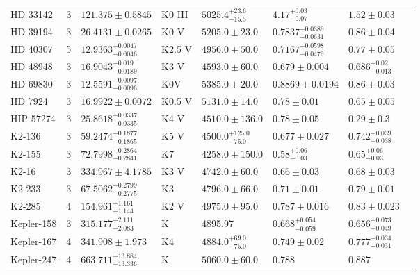 \begin{tabular}{lrllllll}
HD 33142 & 3 & $121.375 \pm 0.5845$ & K0 III & $5025.4^{+23.6}_{-15.5}$ & $4.17^{+0.03}_{-0.07}$ & $1.52 \pm 0.03$ & \cite{TRIFONOV_ET_AL_2022} \\
HD 39194 & 3 & $26.4131 \pm 0.0265$ & K0 V & $5205.0 \pm 23.0$ & $0.7837^{+0.0389}_{-0.0631}$ & $0.86 \pm 0.04$ & \cite{UNGER_ET_AL__2021} \\
HD 40307 & 5 & $12.9363^{+0.0047}_{-0.0046}$ & K2.5 V & $4956.0 \pm 50.0$ & $0.7167^{+0.0598}_{-0.0479}$ & $0.77 \pm 0.05$ & \cite{TUOMI_ET_AL__2013} \\
HD 48948 & 3 & $16.9043^{+0.019}_{-0.0189}$ & K3 V & $4593.0 \pm 60.0$ & $0.679 \pm 0.004$ & $0.686^{+0.02}_{-0.013}$ & \cite{DALAL_ET_AL__2024} \\
HD 69830 & 3 & $12.5591^{+0.0097}_{-0.0096}$ & K0V & $5385.0 \pm 20.0$ & $0.8869 \pm 0.0194$ & $0.86 \pm 0.03$ & \cite{LOVIS_ET_AL__2006} \\
HD 7924 & 3 & $16.9922 \pm 0.0072$ & K0.5 V & $5131.0 \pm 14.0$ & $0.78 \pm 0.01$ & $0.65 \pm 0.05$ & \cite{STASSUN_ET_AL__2017} \\
HIP 57274 & 3 & $25.8618^{+0.0337}_{-0.0335}$ & K4 V & $4510.0 \pm 136.0$ & $0.78 \pm 0.05$ & $0.29 \pm 0.3$ & \cite{STASSUN_ET_AL__2017} \\
K2-136 & 3 & $59.2474^{+0.1877}_{-0.1865}$ & K5 V & $4500.0^{+125.0}_{-75.0}$ & $0.677 \pm 0.027$ & $0.742^{+0.039}_{-0.038}$ & \cite{MAYO_ET_AL_2023} \\
K2-155 & 3 & $72.7998^{+0.2864}_{-0.2841}$ & K7 & $4258.0 \pm 150.0$ & $0.58^{+0.06}_{-0.03}$ & $0.65^{+0.06}_{-0.03}$ & \cite{D_IACUTE_EZ_ALONSO_ET_AL__2018} \\
K2-16 & 3 & $334.967 \pm 4.1785$ & K3 V & $4742.0 \pm 60.0$ & $0.66 \pm 0.03$ & $0.68 \pm 0.03$ & \cite{SINUKOFF_ET_AL__2016} \\
K2-233 & 3 & $67.5062^{+0.2799}_{-0.2775}$ & K3 & $4796.0 \pm 66.0$ & $0.71 \pm 0.01$ & $0.79 \pm 0.01$ & \cite{BARRAG_AMP_AACUTE_N_ET_AL__2023} \\
K2-285 & 4 & $154.961^{+1.161}_{-1.144}$ & K2 V & $4975.0 \pm 95.0$ & $0.787 \pm 0.016$ & $0.83 \pm 0.023$ & \cite{PALLE_ET_AL__2019} \\
Kepler-158 & 3 & $315.177^{+2.111}_{-2.083}$ & K & 4895.97 & $0.668^{+0.054}_{-0.059}$ & $0.656^{+0.073}_{-0.049}$ & \cite{WANG_ET_AL_2024} \\
Kepler-167 & 4 & $341.908 \pm 1.973$ & K4 & $4884.0^{+69.0}_{-75.0}$ & $0.749 \pm 0.02$ & $0.777^{+0.034}_{-0.031}$ & \cite{CHACHAN_ET_AL__2022} \\
Kepler-247 & 4 & $663.711^{+13.884}_{-13.336}$ & K & $5060.0 \pm 60.0$ & 0.788 & 0.887 & \cite{FULTON__AMP__PETIGURA_2018} \\

\end{tabular}
